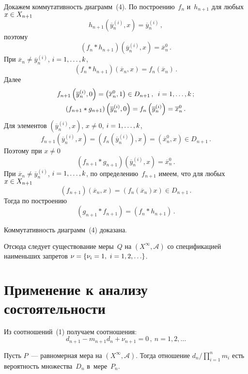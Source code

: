 \begin{multicols}{2}
    Докажем коммутативность диаграмм~(4). По построению~$f_n$
и~$h_{n+1}$ для любых $x\hm\in X_{n+1}$
    $$
    h_{n+1}\left( \overline{y}_n^{(i)},x\right) =\overline{y}_n^{(i)}\,,
    $$
поэтому
$$
\left( f_n * h_{n+1}\right) \left( \overline{y}_n^{(i)},x\right) =\overline{x}_n^0\,.
$$
При $\overline{x}_n \not= \overline{y}_n^{(i)}$, $i \hm= 1,\ldots , k$,
$$
\left( f_n * h_{n+1}\right) \left( \overline{x}_n,x\right)
=f_n\left( \overline{x}_n\right)\,.
$$
Далее
\begin{gather*}
f_{n+1}\left( \overline{y}_n^{(i)},0\right) =\left( \overline{x}_n^0,1\right)\in
D_{n+1}\,,\enskip i=1,\ldots ,k\,;\\
\left( f_{n+1}* g_{n+1}\right) \left( \overline{y}_n^{(i)},0\right) =f_n
\left( \overline{y}_n^{(i)}\right) =\overline{x}_n^0\,.
\end{gather*}
Для элементов $\left( \overline{y}_n^{(i)}, x\right)$, $x\not=0$, $i \hm= 1,\ldots ,
k$,
$$
f_{n+1} \left( \overline{y}_n^{(i)},x\right) =\left( f_n
\left( \overline{y}_n^{(i)}\right),x\right) = \left(\overline{x}_n^0,x\right) \in
D_{n+1}\,.
$$
Поэтому при $x\not=0$
$$
\left( f_{n+1}*g_{n+1}\right) \left( \overline{y}_n^{(i)},x\right)
=\overline{x}_n^0\,.
$$
При  $\overline{x}_n\not= \overline{y}_n^{(i)}$, $i \hm= 1,\ldots , k$, по
определению~$f_{n+1}$ имеем, что для любых $x\hm\in X_{n+1}$
$$
\left( f_{n+1}\right) \left(\overline{x}_n,x\right)
=\left( f_n\left(\overline{x}_n\right)x\right) \in D_{n+1}\,.
$$
Тогда по построению
$$
\left( g_{n+1}*f_{n+1}\right) =\left( f_n* h_{n+1}\right)\,.
$$

    Коммутативность диаграмм~(4) доказана.

    \smallskip

  Отсюда следует существование меры~$Q$ на $(X^\infty, \mathcal{A})$ со
спецификацией наименьших запретов $\nu\hm= \{ \nu_i \hm=1,\ i\hm=
1,2,\ldots\}$.

\section{Применение к анализу состоятельности}

    Из соотношений~(1) получаем соотношения:
    \begin{equation}
    d_{n+1}-m_{n+1}d_n +\nu_{n+1} =0\,,\ n=1,2,\ldots
    \label{e5-grs}
    \end{equation}

    Пусть $P$~--- равномерная мера на $(X^\infty, \mathcal{A})$. Тогда
отношение $d_n\big/\prod\limits_{i=1}^n m_i$ есть вероятность
множества~$D_n$ в~мере~$P_n$.


\end{multicols}
